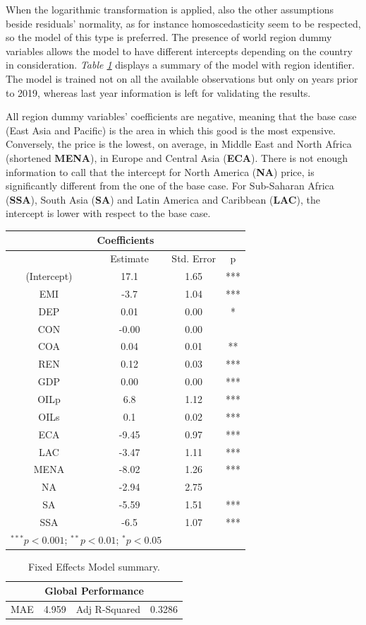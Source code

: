\documentclass[a4paper,12pt]{book}
\begin{document}
When the logarithmic transformation is applied, also the other assumptions beside residuals' normality, as for instance homoscedasticity seem to be respected, so the model of this type is preferred. The presence of world region dummy variables allows the model to have different intercepts depending on the country in consideration. \textit{Table \ref{Tab:xx}} displays a summary of the model with region identifier. The model is trained not on all the available observations but only on years prior to 2019, whereas last year information is left for validating the results.

All region dummy variables' coefficients are negative, meaning that the base case (East Asia and Pacific) is the area in which this good is the most expensive. Conversely, the price is the lowest, on average, in Middle East and North Africa (shortened \textbf{MENA}), in Europe and Central Asia (\textbf{ECA}). There is not enough information to call that the intercept for North America (\textbf{NA}) price, is significantly different from the one of the base case. For Sub-Saharan Africa (\textbf{SSA}), South Asia (\textbf{SA}) and Latin America and Caribbean (\textbf{LAC}), the intercept is lower with respect to the base case.

\begin{table}[tb]
\begin{center}
\begin{tabular}{|c|c|c|c|}
\hline
\multicolumn{4}{|c|}{Coefficients}\\
\hline
&Estimate&Std. Error&p\\
\hline
(Intercept)&17.1&1.65&***\\
EMI&-3.7&1.04&***\\
DEP&0.01&0.00&*\\
CON&-0.00&0.00&\\
COA&0.04&0.01&**\\
REN&0.12&0.03&***\\
GDP&0.00&0.00&***\\
OILp&6.8&1.12&***\\
OILs&0.1&0.02&***\\
ECA&-9.45&0.97&***\\
LAC&-3.47&1.11&***\\
MENA&-8.02&1.26&***\\
NA&-2.94&2.75&\\
SA&-5.59&1.51&***\\
SSA&-6.5&1.07&***\\
\hline
\multicolumn{2}{l}{\scriptsize{$^{***}p<0.001$; $^{**}p<0.01$; $^{*}p<0.05$}}
\end{tabular}
\end{center}
\end{table}
\begin{table}[tb]
\begin{center}
\begin{tabular}{|c|c|c|c|}
\hline
\multicolumn{4}{|c|}{Global Performance}\\
\hline
MAE&4.959&Adj R-Squared&0.3286\\
\hline
\end{tabular}
\caption{Fixed Effects Model summary.}
\label{Tab:xx}
\end{center}
\end{table}
\end{document}

